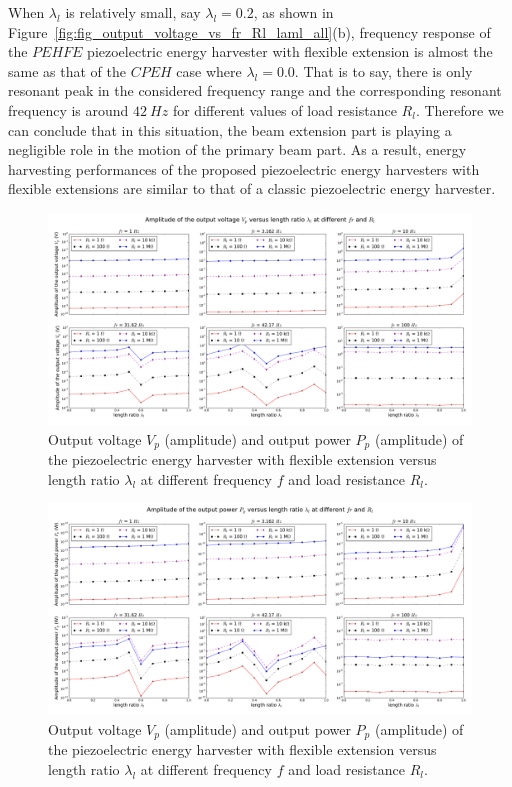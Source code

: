\documentclass{elsarticle}
\begin{document}
When $\lambda_l$ is relatively small, say $\lambda_l = 0.2$, as shown in Figure~\ref{fig:fig_output_voltage_vs_fr_Rl_laml_all}(b), frequency response of the $PEHFE$ piezoelectric energy harvester with flexible extension is almost the same as that of the $CPEH$ case where $\lambda_l = 0.0$. That is to say, there is only resonant peak in the considered frequency range and the corresponding resonant frequency is around $42\ Hz$ for different values of load resistance $R_l$. Therefore we can conclude that in this situation, the beam extension part is playing a negligible role in the motion of the primary beam part. As a result, energy harvesting performances of the proposed piezoelectric energy harvesters with flexible extensions are similar to that of a classic piezoelectric energy harvester. 

\begin{figure}[!htbp]
    \centering
    \includegraphics[width=\textwidth]{./fig_vol_fr_sl_Rl_sl_vs_laml}
    \caption{Output voltage $V_p$ (amplitude) and output power $P_p$ (amplitude) of the piezoelectric energy harvester with flexible extension versus length ratio $\lambda_l$ at different frequency $f$ and load resistance $R_l$. \color{red}{to be revised in the legend, add label (a), (b)}}
    \label{fig:fig_vol_fr_sl_Rl_sl_vs_laml}
\end{figure}


\begin{figure}[!htbp]
    \centering
    \includegraphics[width=\textwidth]{./fig_pow_fr_sl_Rl_sl_vs_laml}
    \caption{Output voltage $V_p$ (amplitude) and output power $P_p$ (amplitude) of the piezoelectric energy harvester with flexible extension versus length ratio $\lambda_l$ at different frequency $f$ and load resistance $R_l$.  \color{red}{to be revised in the legend, add label (a), (b)} }
    \label{fig:fig_pow_fr_sl_Rl_sl_vs_laml}
\end{figure}
\end{document}
